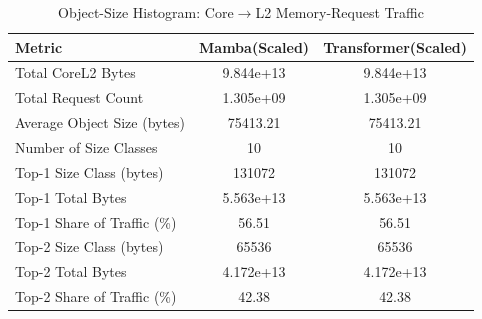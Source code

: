 \begin{table}[h]\centering
    \caption{Object-Size Histogram: Core$\rightarrow$L2 Memory-Request Traffic}
    \label{tab:object_histogram}
    \begin{tabular}{lcc}\hline
    Metric & Mamba(Scaled) & Transformer(Scaled) \\\hline
        Total Core\textrightarrow{}L2 Bytes & 9.844e+13 & 9.844e+13 \\
    Total Request Count & 1.305e+09 & 1.305e+09 \\
    Average Object Size (bytes) & 75413.21 & 75413.21 \\
    Number of Size Classes & 10 & 10 \\
    Top-1 Size Class (bytes) & 131072 & 131072 \\
    Top-1 Total Bytes & 5.563e+13 & 5.563e+13 \\
    Top-1 Share of Traffic (\%) & 56.51 & 56.51 \\
    Top-2 Size Class (bytes) & 65536 & 65536 \\
    Top-2 Total Bytes & 4.172e+13 & 4.172e+13 \\
    Top-2 Share of Traffic (\%) & 42.38 & 42.38 \\
\hline\end{tabular}\end{table}